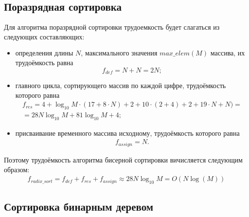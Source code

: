 \subsection{Поразрядная сортировка}
Для алгоритма поразрядной сортировки трудоемкость будет слагаться из следующих составляющих:
\begin{itemize}
	\item определения длины $N$, максимального значения $max\_elem (M)$ массива, их трудоёмкость равна
	\begin{equation}
		\label{complexity1:def2}
		f_{def} = N + N = 2N;
	\end{equation}
	
	\item главного цикла, сортирующего массив по каждой цифре, трудоёмкость которого равна
	\begin{equation}
		\label{сomplexity1:res}
		\begin{gathered}
			f_{res} = 4 + \log_{10} M \cdot (17 + 8 \cdot N) + 2 + 10 \cdot(2 + 4) + 2 + 19 \cdot N + N) = \\
			= 28N\log_{10} M + 81\log_{10} M + 4;
		\end{gathered}
	\end{equation}

	\item присваивание временного массива исходному, трудоёмкость которого равна
	\begin{equation}
	\label{complexity1:assign}
		\begin{gathered}
			f_{assign} = N.
		\end{gathered}
	\end{equation}	

\end{itemize}	
Поэтому трудоёмкость алгоритма бисерной сортировки вичисляется следующим образом: 
\begin{equation}
	\label{сomplexity:radix_worst}
	\begin{gathered}
		f_{radix\_sort} = f_{def} + f_{res} + f_{assign} \approx 28N\log_{10}M = O(N\log(M))
	\end{gathered}
\end{equation}


\subsection{Сортировка бинарным деревом}

